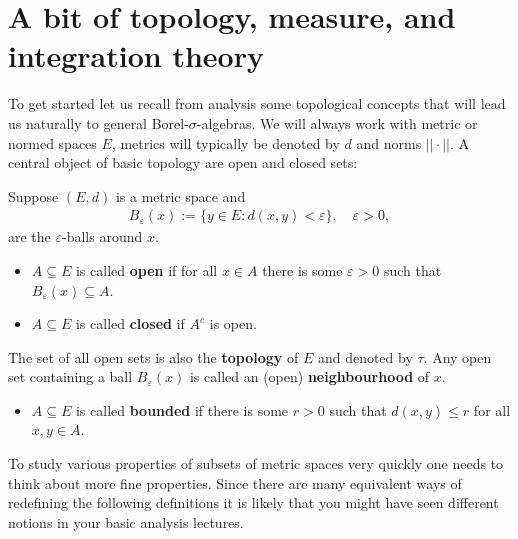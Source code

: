 \section{A bit of topology, measure, and integration theory}
To get started let us recall from analysis some topological concepts that will lead us naturally to general Borel-$\sigma$-algebras. We will always work with metric or normed spaces $E$, metrics will typically be denoted by $d$ and norms $||\cdot||$. A central object of basic topology are open and closed sets:
\begin{ldef}
\begin{deff}
	Suppose $(E,d)$ is a metric space and 
	\begin{align*}
		B_\varepsilon(x):=\{y\in E: d(x,y)<\varepsilon\},\quad \varepsilon>0,
	\end{align*}
	are the $\varepsilon$-balls around $x$. 
	\begin{itemize}
		\item $A\subseteq E$ is called \textbf{open} if for all $x\in A$ there is some $\varepsilon>0$ such that $B_\varepsilon(x)\subseteq A$.
		\item $A\subseteq E$ is called \textbf{closed} if $A^c$ is open.
	\end{itemize}	
	The set of all open sets is also the \textbf{topology} of $E$ and denoted by $\tau$. Any open set containing a ball $B_\varepsilon(x)$ is called an (open) \textbf{neighbourhood} of $x$.
	\begin{itemize}
		\item $A\subseteq E$ is called \textbf{bounded} if there is some $r>0$ such that $d(x,y)\leq r$ for all $x,y\in A$.
	\end{itemize}
\end{deff}
\end{ldef}
To study various properties of subsets of metric spaces very quickly one needs to think about more fine properties. Since there are many equivalent ways of redefining the following definitions it is likely that you might have seen different notions in your basic analysis lectures.
